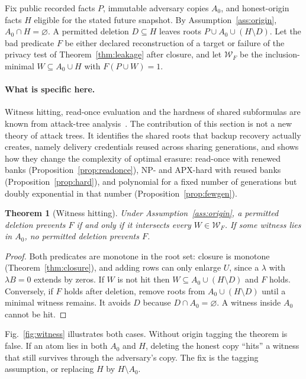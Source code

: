 \documentclass[pdflatex,sn-mathphys-num,twocolumn]{sn-jnl}
\theoremstyle{plain}
\newtheorem{theorem}{Theorem}
\theoremstyle{definition}
\begin{document}
Fix public recorded facts $P$, immutable adversary copies $A_0$, and honest-origin facts $H$ eligible for the stated future snapshot. By Assumption~\ref{ass:origin}, $A_0\cap H=\varnothing$. A permitted deletion $D\subseteq H$ leaves roots $P\cup A_0\cup(H\setminus D)$. Let the bad predicate $F$ be either declared reconstruction of a target or failure of the privacy test of Theorem~\ref{thm:leakage} after closure, and let $\mathcal W_F$ be the inclusion-minimal $W\subseteq A_0\cup H$ with $F(P\cup W)=1$.

\paragraph{What is specific here.}
Witness hitting, read-once evaluation and the hardness of shared subformulas are known from attack-tree analysis~\cite{mauw2005,lopuhaa2022}. The contribution of this section is not a new theory of attack trees. It identifies the shared roots that backup recovery actually creates, namely delivery credentials reused across sharing generations, and shows how they change the complexity of optimal erasure: read-once with renewed banks (Proposition~\ref{prop:readonce}), NP- and APX-hard with reused banks (Proposition~\ref{prop:hard}), and polynomial for a fixed number of generations but doubly exponential in that number (Proposition~\ref{prop:fewgen}).

\begin{theorem}[Witness hitting]\label{thm:cuts}
Under Assumption~\ref{ass:origin}, a permitted deletion prevents $F$ if and only if it intersects every $W\in\mathcal W_F$. If some witness lies in $A_0$, no permitted deletion prevents $F$.
\end{theorem}
\begin{proof}
Both predicates are monotone in the root set: closure is monotone (Theorem~\ref{thm:closure}), and adding rows can only enlarge $U$, since a $\lambda$ with $\lambda B=0$ extends by zeros. If $W$ is not hit then $W\subseteq A_0\cup(H\setminus D)$ and $F$ holds. Conversely, if $F$ holds after deletion, remove roots from $A_0\cup(H\setminus D)$ until a minimal witness remains. It avoids $D$ because $D\cap A_0=\varnothing$. A witness inside $A_0$ cannot be hit.
\end{proof}

Fig.~\ref{fig:witness} illustrates both cases. Without origin tagging the theorem is false. If an atom lies in both $A_0$ and $H$, deleting the honest copy ``hits'' a witness that still survives through the adversary's copy. The fix is the tagging assumption, or replacing $H$ by $H\setminus A_0$.
\end{document}
